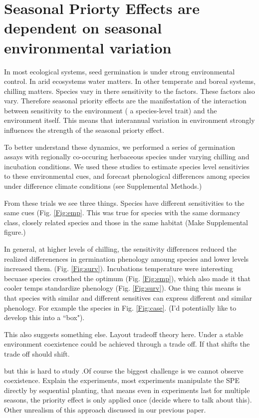 \documentclass{article}[12pt]
\begin{document}
\section*{Seasonal Priorty Effects are dependent on seasonal environmental variation}

In most ecological systems, seed germination is under strong environmental control. In arid ecosystems water matters. In other temperate and boreal systems, chilling matters. Species vary in there sensitivity to the factors. These factors also vary. Therefore seasonal priority effects are the manifestation of the interaction between sensitivity to the environment ( a species-level trait) and the environment itself. This means that interannual variation in environment strongly influences the strength of the seasonal priorty effect.

To better understand these dynamics, we performed a series of germination assays with regionally co-occuring herbaceous species under varying chilling and incubation conditions. We used these studies to estimate species level sensitivies to these environmental cues, and forecast phenological differences among species under difference climate conditions (see Supplemental Methods.)

From these trials we see three things. Species have different sensitivities to the same cues (Fig. \ref{Fig:emp}. This was true for species with the same dormancy class, closely related species and those in the same habitat (Make Supplemental figure.)

In general, at higher levels of chilling, the sensitivity differences reduced the realized differenences in germination phenology amoung species and lower levels increased them. (Fig. \ref{Fig:surv}). Incubations temperature were interesting becuase species crossthed the optimum (Fig. \ref{Fig:emp}), which also made it that cooler temps standardize phenology (Fig. \ref{Fig:surv}). One thing this means is that species with similar and different sensitives can express different and similar phenology. For example the species in Fig. \ref{Fig:case}. (I'd potentially like to develop this into a ``box").

This also suggests something else. Layout tradeoff theory here. Under a stable environment coexistence could be achieved through a trade off. If that shifts the trade off should shift.


but this is hard to study .Of course the biggest challenge is we cannot observe coexistence. Explain the experiments, most experiments manipulate the SPE directly by sequential planting, that means even in experiments last for multiple seasons, the priority effect is only applied once (decide where to talk about this). Other unrealism of this approach discussed in our previous paper.
\end{document}
